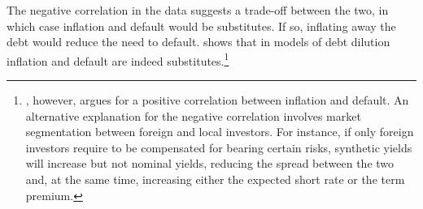 {%
The negative correlation in the data suggests a trade-off between the two, in which case inflation and default would be substitutes.
If so, inflating away the debt would reduce the need to default.
\cite{Galli:2020} shows that in models of debt dilution inflation and default are indeed substitutes.\footnote{ \cite{Galli:2020}, however, argues for a positive correlation between inflation and default. An alternative explanation for the negative correlation involves market segmentation between foreign and local investors. For instance, if only foreign investors require to be compensated for bearing certain risks, synthetic yields will increase but not nominal yields, reducing the spread between the two and, at the same time, increasing either the expected short rate or the term premium.}


}
